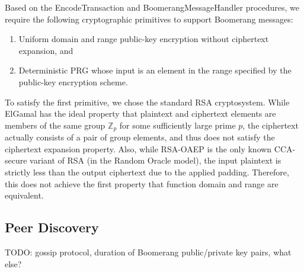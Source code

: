 
Based on the {\sf EncodeTransaction} and {\sf BoomerangMessageHandler} procedures, we require the following cryptographic primitives to support Boomerang messages:
\begin{enumerate}
	\item Uniform domain and range public-key encryption without ciphertext expansion, and
	\item Deterministic PRG whose input is an element in the range specified by the public-key encryption scheme.
\end{enumerate}

To satisfy the first primitive, we chose the standard RSA cryptosystem. While ElGamal has the ideal property that plaintext and ciphertext elements are members of the same group $\mathbb{Z}_p$ for some sufficiently large prime $p$, the ciphertext actually consists of a pair of group elements, and thus does not satisfy the ciphertext expansion property. Also, while RSA-OAEP is the only known CCA-secure variant of RSA (in the Random Oracle model), the input plaintext is strictly less than the output ciphertext due to the applied padding. Therefore, this does not achieve the first property that function domain and range are equivalent. 



\subsection{Peer Discovery}
TODO: gossip protocol, duration of Boomerang public/private key pairs, what else?




